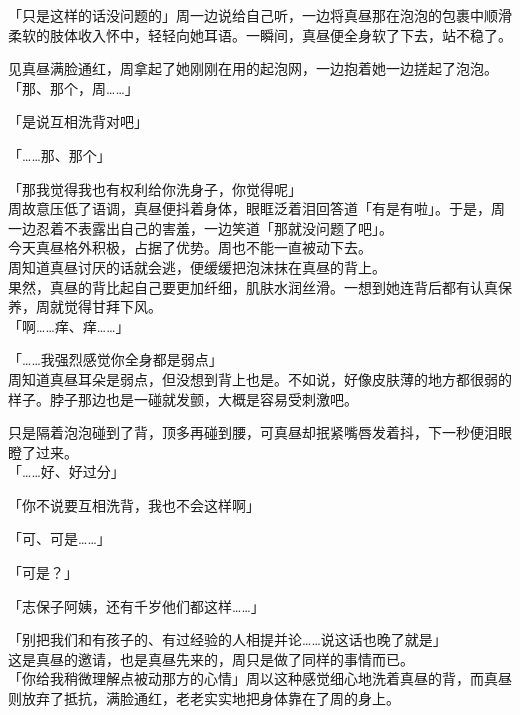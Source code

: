「只是这样的话没问题的」周一边说给自己听，一边将真昼那在泡泡的包裹中顺滑柔软的肢体收入怀中，轻轻向她耳语。一瞬间，真昼便全身软了下去，站不稳了。

见真昼满脸通红，周拿起了她刚刚在用的起泡网，一边抱着她一边搓起了泡泡。\\

「那、那个，周……」

「是说互相洗背对吧」

「……那、那个」

「那我觉得我也有权利给你洗身子，你觉得呢」\\

周故意压低了语调，真昼便抖着身体，眼眶泛着泪回答道「有是有啦」。于是，周一边忍着不表露出自己的害羞，一边笑道「那就没问题了吧」。\\

今天真昼格外积极，占据了优势。周也不能一直被动下去。\\

周知道真昼讨厌的话就会逃，便缓缓把泡沫抹在真昼的背上。\\

果然，真昼的背比起自己要更加纤细，肌肤水润丝滑。一想到她连背后都有认真保养，周就觉得甘拜下风。\\

「啊……痒、痒……」

「……我强烈感觉你全身都是弱点」\\

周知道真昼耳朵是弱点，但没想到背上也是。不如说，好像皮肤薄的地方都很弱的样子。脖子那边也是一碰就发颤，大概是容易受刺激吧。

只是隔着泡泡碰到了背，顶多再碰到腰，可真昼却抿紧嘴唇发着抖，下一秒便泪眼瞪了过来。\\

「……好、好过分」

「你不说要互相洗背，我也不会这样啊」

「可、可是……」

「可是？」

「志保子阿姨，还有千岁他们都这样……」

「别把我们和有孩子的、有过经验的人相提并论……说这话也晚了就是」\\

这是真昼的邀请，也是真昼先来的，周只是做了同样的事情而已。\\

「你给我稍微理解点被动那方的心情」周以这种感觉细心地洗着真昼的背，而真昼则放弃了抵抗，满脸通红，老老实实地把身体靠在了周的身上。
